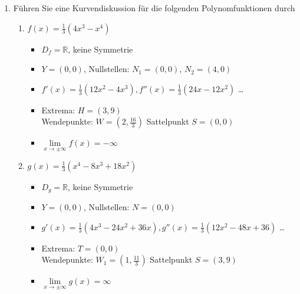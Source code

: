 \begin{enumerate}
    \item
          Führen Sie eine Kurvendiskussion für die folgenden Polynomfunktionen durch
          \begin{enumerate}
              \item $f(x) = \frac{1}{3}(4x^3 - x^4)$
                    \begin{itemize}
                        \item $D_f = \mathbb{R}$, keine Symmetrie
                        \item $Y = (0, 0)$, Nullstellen: $N_1 = (0, 0)$, $N_2 = (4, 0)$
                        \item $f'(x) =\frac{1}{3}(12x^2 - 4x^3) , f''(x)=\frac{1}{3}(24x - 12x^2)$ \dots
                        \item Extrema: $H = (3, 9)$ \\
                              Wendepunkte: $W = (2, \frac{16}{3})$
                              Sattelpunkt $S = (0, 0)$
                        \item $\lim\limits_{x \to \pm\infty} f(x) = -\infty$
                    \end{itemize}

              \item $g(x) = \frac{1}{3}(x^4 - 8x^3 + 18x^2)$
                    \begin{itemize}
                        \item $D_g = \mathbb{R}$, keine Symmetrie
                        \item $Y = (0, 0)$, Nullstellen: $N = (0,0)$
                        \item $g'(x)= \frac{1}{3}(4x^3 - 24x^2 + 36x), g''(x)= \frac{1}{3}(12x^2 - 48x + 36)$ \dots
                        \item Extrema: $T=(0, 0)$ \\
                              Wendepunkte: $W_1 = (1, \frac{11}{3})$
                              Sattelpunkt $S = (3, 9)$
                        \item $\lim\limits_{x \to \pm\infty} g(x) = \infty$
                    \end{itemize}


\end{enumerate}
\end{enumerate}
